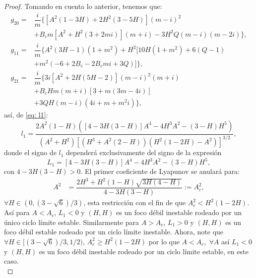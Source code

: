 \documentclass[]{article}
\theoremstyle{remark}
\begin{document}
\begin{proof}
		\noindent Tomando en cuenta lo anterior, tenemos que:
		\begin{equation}
			\begin{aligned}
				g_{20} = & \dfrac{i}{m}\{[A^2(1 - 3H) + 2H^2(3 - 5H)](m-i)^2 \\ 
				& + B_cm[A^2 + H^2(3 + 2mi)](m+i) - 3H^2Q(m-i)(m-2i) \}, \\
				g_{11} = & \dfrac{i}{m} \{A^2(3H-1)(1 + m^2) + H^2[10H(1 + m^2) + 6(Q-1) \\ 
				& + m^2(-6 + 2B_c - 2B_cmi + 3Q)]\}, \\
				g_{21} = & \dfrac{i}{m} \{3i[A^2 + 2H(5H-2)](m-i)^2(m+i) \\ 
				& + B_cHm(m+i)[3 + m(3m-4i)] \\ 
				& + 3QH(m-i)(4i + m + m^2i)\},
			\end{aligned}
			\label{eq: g_klModelo2}
		\end{equation}
		así, de \eqref{eq: l1}:
		\begin{equation}
			l_1 = \dfrac{2A^2(1 - H)([4 - 3H(3 - H)]A^4 -4H^3A^2 - (3 - H)H^5)}{(A^2 + H^2)[(H^3 + A^2(2 - H))(H^2(1 - 2H)- A^2)]^{3/2}},
			\label{eq: l1Kuznetsov}
		\end{equation}
		donde el signo de $l_1$ dependerá exclusivamente del signo de la expresión
		\begin{equation*}
			L_1 = [4 - 3H(3-H)]A^4 - 4H^3A^2 - (3-H)H^5,
		\end{equation*}
		con $4 - 3H(3-H) > 0$. El primer coeficiente de Lyapunov se anulará para:
		\begin{equation*}
			\begin{aligned}
				A^2 &= \dfrac{2H^3 + H^2(1 - H)\sqrt{3H(4 - H)}}{4-3H(3-H)} := A^2_c,
			\end{aligned}
		\end{equation*}
		$\forall H \in \left(0,(3 - \sqrt{6})/3 \right)$, esta restricción con el fin de que $A_c^2 < H^2(1-2H)$. Así para $A<A_c$, $L_1<0$ y $(H,H)$ es un foco débil inestable rodeado por un único ciclo límite estable. Similarmente para $A>A_c$, $L_1 > 0$ y $(H,H)$ es un foco débil estable rodeado por un ciclo límite inestable. Ahora, note que $\forall H \in [(3 - \sqrt{6})/3, 1/2)$, $A_c^2 \geq H^2(1-2H)$ por lo que $A<A_c, \; \forall A$ así $L_1<0$ y $(H,H)$ es un foco débil inestable rodeado por un ciclo límite estable, en este caso. \\
		

\end{proof}
\end{document}

